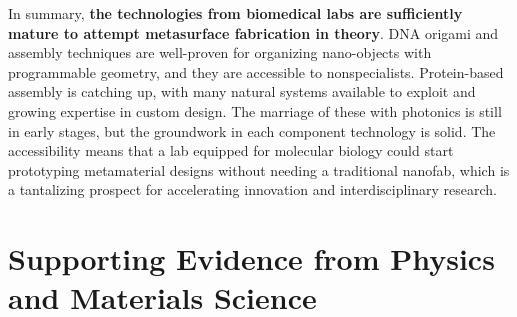 \documentclass[11pt,a4paper]{article}
\begin{document}
In summary, \textbf{the technologies from biomedical labs are sufficiently mature to attempt metasurface fabrication in theory}. DNA origami and assembly techniques are well-proven for organizing nano-objects with programmable geometry, and they are accessible to nonspecialists. Protein-based assembly is catching up, with many natural systems available to exploit and growing expertise in custom design. The marriage of these with photonics is still in early stages, but the groundwork in each component technology is solid. The accessibility means that a lab equipped for molecular biology could start prototyping metamaterial designs without needing a traditional nanofab, which is a tantalizing prospect for accelerating innovation and interdisciplinary research.

\section{Supporting Evidence from Physics and Materials Science}
\end{document}

